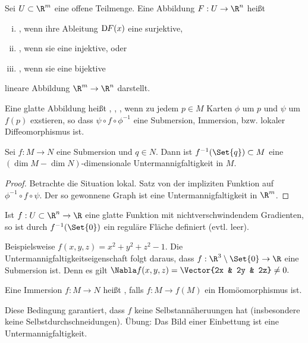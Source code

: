 \begin{df}
    Sei $U \subset \R^m$ eine offene Teilmenge.
    Eine Abbildung $F: U \to \R^n$ heißt
    \begin{enumerate}[i)]
        \item
            , wenn ihre Ableitung $\Df[F] (x)$ eine surjektive,
        \item
            , wenn sie eine injektive, oder
        \item
            , wenn sie eine bijektive
    \end{enumerate}
    lineare Abbildung $\R^m \to \R^n$ darstellt.

    Eine glatte Abbildung heißt , , , wenn zu jedem $p \in M$ Karten $\phi$ um $p$ und $\psi$ um $f(p)$ exstieren, so dass $\psi \circ f \circ \phi^{-1}$ eine Submersion, Immersion, bzw. lokaler Diffeomorphismus ist.
\end{df}

\begin{st} \label{2.5}
    Sei $f: M \to N$ eine Submersion und $q \in N$.
    Dann ist $f^{-1}(\Set{q}) \subset M$ eine $(\dim M - \dim N)$-dimensionale Untermannigfaltigkeit in $M$.
    \begin{proof}
        Betrachte die Situation lokal.
        Satz von der impliziten Funktion auf $\phi^{-1} \circ f \circ \psi$.
        Der so gewonnene Graph ist eine Untermannigfaltigkeit in $\R^m$.
    \end{proof}
\end{st}

\begin{ex}
    Ist $f: U \subset \R^n \to \R$ eine glatte Funktion mit nichtverschwindendem Gradienten, so ist durch $f^{-1}(\Set{0})$ ein reguläre Fläche definiert (evtl. leer).

    Beispielsweise $f(x,y,z) = x^2 + y^2 + z^2 - 1$.
    Die Untermannigfaltigkeitseigenschaft folgt daraus, dass $f:\R^3 \setminus \Set{0} \to \R$ eine Submersion ist.
    Denn es gilt
    \begin{math}
        \Nabla f(x,y,z) = \Vector{2x & 2y & 2z} \neq 0.
    \end{math}
\end{ex}

\begin{df} \label{2.6}
    Eine Immersion $f:M \to N$ heißt , falls $f: M \to f(M)$ ein Homöomorphismus ist.
    \begin{note}
        Diese Bedingung garantiert, dass $f$ keine Selbstannäheruungen hat (insbesondere keine Selbstdurchschneidungen).
        Übung: Das Bild einer Einbettung ist eine Untermannigfaltigkeit.
    \end{note}
\end{df}

